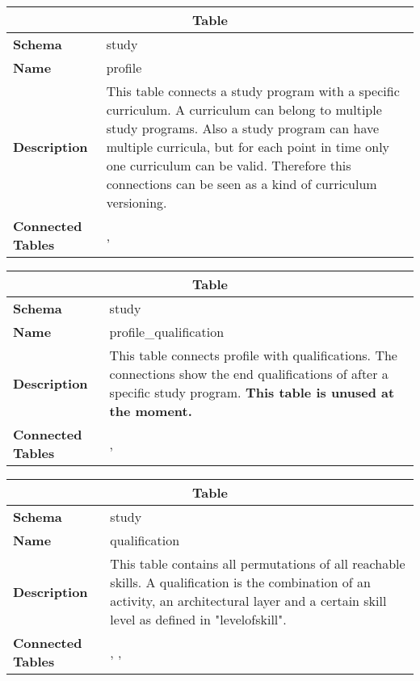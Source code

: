 \begin{table}[H]
	\label{table:profile}
	\centering
	\begin{tabular}{|p{}|p{}|}
		\hline
		\multicolumn{2}{|c|}{\textbf{Table}} \\ \hline
		\textbf{Schema}               & study \\ \hline
		\textbf{Name}                 & profile \\ \hline
		\textbf{Description}          & This table connects a study program with a specific curriculum. A curriculum can belong to multiple study programs. Also a study program can have multiple curricula, but for each point in time only one curriculum can be valid. Therefore this connections can be seen as a kind of curriculum versioning. \\ \hline
		\textbf{Connected Tables}     & \tableref{curriculum}, \tableref{studyprogramme} \\ \hline
	\end{tabular}
\end{table}

\begin{table}[H]
	\label{table:profile_qualification}
	\centering
	\begin{tabular}{|p{}|p{}|}
		\hline
		\multicolumn{2}{|c|}{\textbf{Table}} \\ \hline
		\textbf{Schema}               & study \\ \hline
		\textbf{Name}                 & profile\_qualification \\ \hline
		\textbf{Description}          & This table connects profile with qualifications. The connections show the end qualifications of after a specific study program. \textbf{This table is unused at the moment.} \\ \hline
		\textbf{Connected Tables}     & \tableref{profile}, \tableref{qualification} \\ \hline
	\end{tabular}
\end{table}

\begin{table}[H]
	\label{table:qualification}
	\centering
	\begin{tabular}{|p{}|p{}|}
		\hline
		\multicolumn{2}{|c|}{\textbf{Table}} \\ \hline
		\textbf{Schema\newcolumntype{name}{argument}}               & study \\ \hline
		\textbf{Name}                 & qualification \\ \hline
		\textbf{Description}          & This table contains all permutations of all reachable skills. A qualification is the combination of an activity, an architectural layer and a certain skill level as defined in "levelofskill". \\ \hline
		\textbf{Connected Tables}     & \tableref{activity}, \tableref{architecturallayer}, \tableref{levelofskill} \\ \hline
	\end{tabular}
\end{table}

